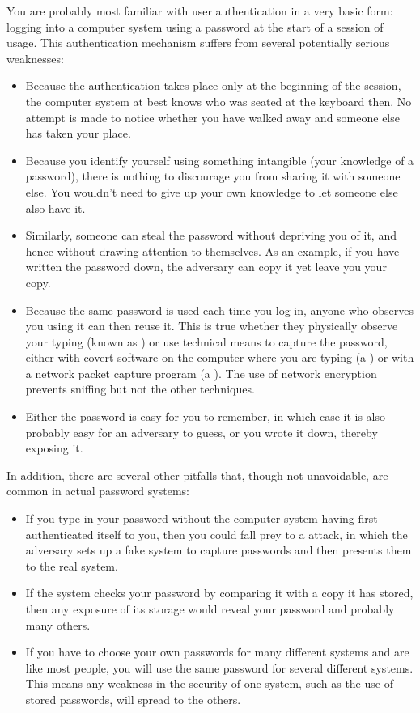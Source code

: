 You are probably most familiar with user authentication in a very basic
form: logging into a computer system using a password at the start of
a session of usage.  This authentication mechanism suffers from
several potentially serious weaknesses:
\begin{itemize}
\item Because the authentication takes place only at the beginning of
  the session, the computer system at best knows who was seated at the
  keyboard then.  No attempt is made to notice whether you have walked
  away and someone else has taken your place.
\item Because you identify yourself using something intangible (your
  knowledge of a password), there is nothing to discourage you from
  sharing it with someone else.  You wouldn't need to give up your own
  knowledge to let someone else also have it.
\item Similarly, someone can steal the password without depriving you
  of it, and hence without drawing attention to themselves.  As an
  example, if you have written the password down, the adversary can
  copy it yet leave you your copy.
\item Because the same password is used each time you log in, anyone
  who observes you using it can then reuse it.  This is true whether
  they physically observe your typing (known as ) or use technical means to capture the password, either
  with covert software on the computer where you are typing (a
  ) or with a network packet capture program (a
  ).  The use of network encryption prevents sniffing but
  not the other techniques.
\item Either the password is easy for you to remember, in which case
  it is also probably easy for an adversary to guess, or you wrote it
  down, thereby exposing it.
\end{itemize}
In addition, there are several other pitfalls that, though not
unavoidable, are common in actual password systems:
\begin{itemize}
\item
If you type in your password without the computer system having first
authenticated itself to you, then you could fall prey to a
 attack, in which the adversary sets up a fake system
to capture passwords and then presents them to the real system.
\item
If the system checks your password by comparing it with a copy it has
stored, then any exposure of its storage would reveal your password
and probably many others.
\item
If you have to choose your own passwords for many different systems
and are like most people, you will use the same password for several
different systems.  This means any weakness in the security of one
system, such as the use of stored passwords, will spread to the others.
\end{itemize}


